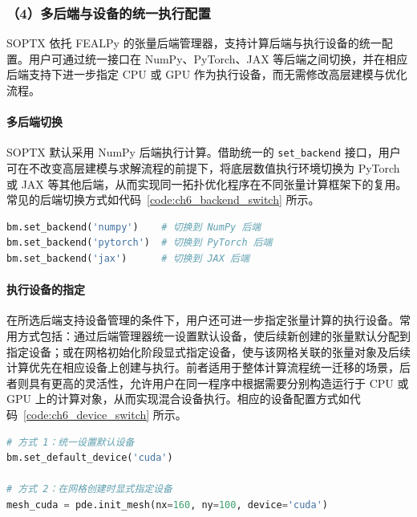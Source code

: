 \subsubsection*{（4）多后端与设备的统一执行配置}

SOPTX 依托 FEALPy 的张量后端管理器，支持计算后端与执行设备的统一配置。用户可通过统一接口在 NumPy、PyTorch、JAX 等后端之间切换，并在相应后端支持下进一步指定 CPU 或 GPU 作为执行设备，而无需修改高层建模与优化流程。

\paragraph*{多后端切换}

SOPTX 默认采用 NumPy 后端执行计算。借助统一的 \texttt{set\_backend} 接口，用户可在不改变高层建模与求解流程的前提下，将底层数值执行环境切换为 PyTorch 或 JAX 等其他后端，从而实现同一拓扑优化程序在不同张量计算框架下的复用。常见的后端切换方式如代码~\ref{code:ch6_backend_switch} 所示。
\begin{lstlisting}[language=Python, 
	caption={多后端切换的统一配置接口}, 
	label={code:ch6_backend_switch}, 
	basicstyle=\footnotesize\ttfamily,
	]
bm.set_backend('numpy')    # 切换到 NumPy 后端
bm.set_backend('pytorch')  # 切换到 PyTorch 后端
bm.set_backend('jax')      # 切换到 JAX 后端
\end{lstlisting}

\paragraph*{执行设备的指定}

在所选后端支持设备管理的条件下，用户还可进一步指定张量计算的执行设备。常用方式包括：通过后端管理器统一设置默认设备，使后续新创建的张量默认分配到指定设备；或在网格初始化阶段显式指定设备，使与该网格关联的张量对象及后续计算优先在相应设备上创建与执行。前者适用于整体计算流程统一迁移的场景，后者则具有更高的灵活性，允许用户在同一程序中根据需要分别构造运行于 CPU 或 GPU 上的计算对象，从而实现混合设备执行。相应的设备配置方式如代码~\ref{code:ch6_device_switch} 所示。
\begin{lstlisting}[language=Python,
	caption={异构设备切换的统一配置接口},
	label={code:ch6_device_switch},
	basicstyle=\footnotesize\ttfamily,
]
# 方式 1：统一设置默认设备
bm.set_default_device('cuda')

# 方式 2：在网格创建时显式指定设备
mesh_cuda = pde.init_mesh(nx=160, ny=100, device='cuda')
\end{lstlisting}


